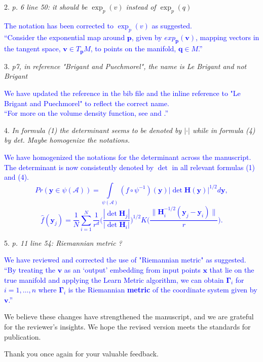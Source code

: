 \documentclass{article}
\begin{document}
2. \textit{p. 6 line 50: it should be \(\exp _{p}(v)\) instead of \(\exp _{p}(q)\)}

   \textcolor{blue}{
   The notation has been corrected to \(\exp_{p}(v)\) as suggested. \\
   ``Consider the exponential map around \(\bm{p}\), given by \(exp_{\bm{p}}(\bm{v})\), mapping vectors in the tangent space, \(\bm{v}\in T_{\bm{p}}M\), to points on the manifold, \(\bm{q}\in M\).''
   }

3. \textit{p7, in reference "Brigant and Puechmorel", the name is Le Brigant and not Brigant}

   \textcolor{blue}{
   We have updated the reference in the bib file and the inline reference to "Le Brigant and Puechmorel" to reflect the correct name. \\
   ``For more on the volume density function, see \textcite{Gallot2004-rc} and \textcite{Le_Brigant2019-lj}.''}

4. \textit{In formula (1) the determinant seems to be denoted by \(|\cdot|\) while in formula (4) by det. Maybe homogenize the notations.}

   \textcolor{blue}{
   We have homogenized the notations for the determinant across the manuscript. The determinant is now consistently denoted by \(\det\) in all relevant formulas (1) and (4). \\
   \begin{equation}
    \label{eq:changevar}
    Pr(\bm{y}\in\psi(\mathcal{A}))=\int\limits_{\psi(\mathcal{A})} (f\circ\psi^{-1})(\bm{y})|\det \bm{H}(\bm{y})|^{1/2}d\bm{y},
    \end{equation}
    \begin{equation}
    \label{eq:denestimator}
    \hat{f}(\bm{y}_j) = \frac{1}{N} \sum_{i=1}^{N} \frac{1}{r^d} \bigg(\frac{|\det \bm{H}_j|}{|\det \bm{H}_i|} \bigg)^{1/2} K\bigg( \frac{\| \bm{H}^{-1/2}_i (\bm{y}_j - \bm{y}_i)\|}{r} \bigg).
    \tag{4}
    \end{equation}
    }

5. \textit{p. 11 line 54: Riemannian metric ?}

   \textcolor{blue}{
   We have reviewed and corrected the use of "Riemannian metric" as suggested. \\
   ``By treating the \(\bm{v}\) as an `output' embedding from input points \(\bm{x}\) that lie on the true manifold and applying the Learn Metric algorithm, we can obtain \(\bm{\Gamma}_i\) for \(i=1,\dots,n\) where \(\bm{\Gamma}_i\) is the Riemannian \textbf{metric} of the coordinate system given by \(\bm{v}\).''
   }


\vspace{0.5cm}

We believe these changes have strengthened the manuscript, and we are grateful for the reviewer's insights. We hope the revised version meets the standards for publication.

Thank you once again for your valuable feedback.


\printbibliography

% 
% 
\end{document}
